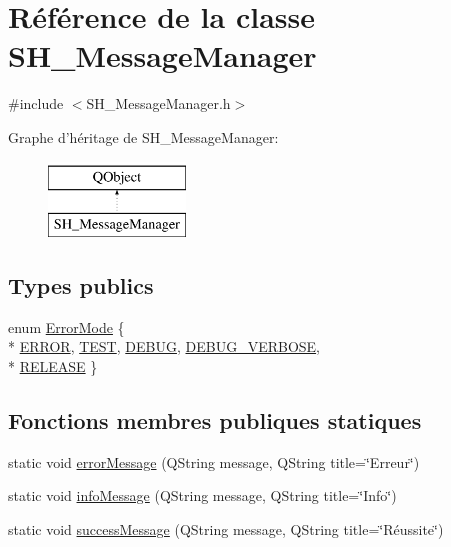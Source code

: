 \hypertarget{classSH__MessageManager}{\section{Référence de la classe S\-H\-\_\-\-Message\-Manager}
\label{classSH__MessageManager}
}


{\ttfamily \#include $<$S\-H\-\_\-\-Message\-Manager.\-h$>$}

Graphe d'héritage de S\-H\-\_\-\-Message\-Manager\-:\begin{figure}[H]
\begin{center}
\leavevmode
\includegraphics[height=2.000000cm]{classSH__MessageManager}
\end{center}
\end{figure}
\subsection*{Types publics}
\begin{DoxyCompactItemize}
\item 
enum \hyperlink{classSH__MessageManager_a13742daa1342475d4fcee295b9dee4ee}{Error\-Mode} \{ \\*
\hyperlink{classSH__MessageManager_a13742daa1342475d4fcee295b9dee4eeaed8e377759e5f203a417dbd267cbc33a}{E\-R\-R\-O\-R}, 
\hyperlink{classSH__MessageManager_a13742daa1342475d4fcee295b9dee4eea20e4a860505461ef78ebb902cac1bbc7}{T\-E\-S\-T}, 
\hyperlink{classSH__MessageManager_a13742daa1342475d4fcee295b9dee4eeac1f651f46ed4faeccbb6ce75f31c6123}{D\-E\-B\-U\-G}, 
\hyperlink{classSH__MessageManager_a13742daa1342475d4fcee295b9dee4eea10b19d57d9a8572101d39b51cdca79d0}{D\-E\-B\-U\-G\-\_\-\-V\-E\-R\-B\-O\-S\-E}, 
\\*
\hyperlink{classSH__MessageManager_a13742daa1342475d4fcee295b9dee4eea81df11b9abe47d3c95d300a3ff71227e}{R\-E\-L\-E\-A\-S\-E}
 \}
\end{DoxyCompactItemize}
\subsection*{Fonctions membres publiques statiques}
\begin{DoxyCompactItemize}
\item 
static void \hyperlink{classSH__MessageManager_a0cb4f06cf67539457482ba1c8544eb06}{error\-Message} (Q\-String message, Q\-String title=\char`\"{}Erreur\char`\"{})
\item 
static void \hyperlink{classSH__MessageManager_a0b35c2f96e6d69934bf7f7c1e2172ea9}{info\-Message} (Q\-String message, Q\-String title=\char`\"{}Info\char`\"{})
\item 
static void \hyperlink{classSH__MessageManager_a829b465beb548a78616c0c97439bf720}{success\-Message} (Q\-String message, Q\-String title=\char`\"{}Réussite\char`\"{})
\end{DoxyCompactItemize}



